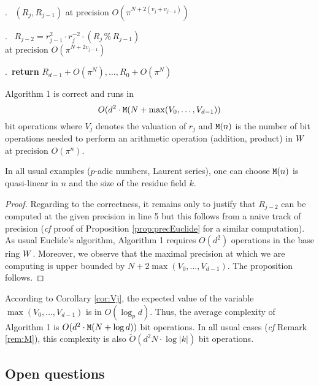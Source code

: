 \documentclass{sig-alternate}
\begin{document}
\smallskip{}.\ \hspace{0.3cm}{\bf lift} $(R_j, R_{j-1})$ at precision $O(\pi^{N+2(v_j + v_{j-1})})$

\smallskip{}.\ \hspace{0.3cm}{\bf compute} $R_{j-2} = r_{j-1}^2 \cdot r_j^{-2} \cdot (R_j \,\%\, R_{j-1})$\\
\phantom{6.\ }\hspace{0.3cm}at precision $O(\pi^{N+2 v_{j-1}})$

\smallskip{}.\ {\bf return} $R_{d-1} + O(\pi^N), \ldots,
R_0 + O(\pi^N)$

\vspace{-1ex}\noindent\hrulefill

\begin{prop}
Algorithm 1 is correct and runs in
$$O(d^2 \cdot \text{\tt M}(N + \max(V_0, \ldots, V_{d-1}))$$
bit operations where $V_j$ denotes the valuation of $r_j$ and 
$\text{\tt M}(n)$ is the number of bit operations needed to perform an 
arithmetic operation (addition, product) in $W$ at precision 
$O(\pi^n)$.
\end{prop}

\begin{rem}
\label{rem:M}
In all usual examples ($p$-adic numbers, Laurent series), one can 
choose $\text{\tt M}(n)$ is quasi-linear in $n$ and the size of the residue
field $k$.
\end{rem}

\begin{proof}
Regarding to the correctness, it remains only to justify that $R_{j-2}$ 
can be computed at the given precision in line 5 but this follows 
from a naive track of precision (\emph{cf} proof of Proposition
\ref{prop:precEuclide} for a similar computation).
As usual Euclide's algorithm, Algorithm 1 requires $O(d^2)$ operations 
in the base ring $W$. Moreover, we observe that the maximal precision 
at which we are computing is upper bounded by $N + 2 \max(V_0, \ldots, 
V_{d-1})$. The proposition follows.
\end{proof}

According to Corollary \ref{cor:Vj}, the expected value of the variable 
$\max(V_0, \ldots, V_{d-1})$ is in $O(\log_p d)$. Thus, the average 
complexity of Algorithm 1 is $O(d^2 \cdot \text{\tt M}(N + \log d))$ bit 
operations. In all usual cases (\emph{cf} Remark \ref{rem:M}), this
complexity is also $\tilde O(d^2 N \cdot \log |k|)$ bit operations.

\subsection{Open questions}
\label{subsec:questions}
\end{document}
